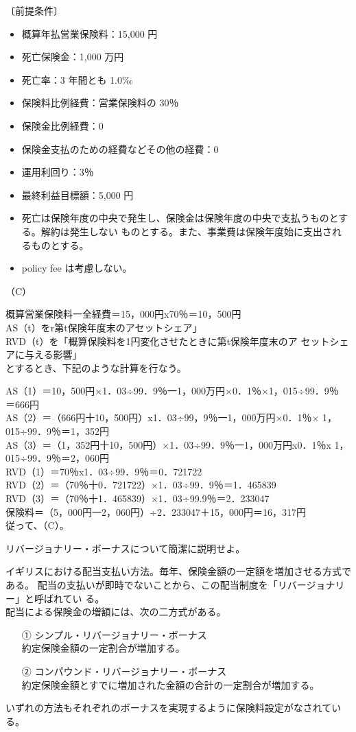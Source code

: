 \documentclass[report,gutter=10mm,fore-edge=10mm,uplatex,dvipdfmx]{jlreq}
\begin{document}
〔前提条件〕
\begin{itemize}
 \item  概算年払営業保険料：15,000 円
 \item 死亡保険金：1,000 万円
 \item  死亡率：3 年間とも 1.0‰
 \item  保険料比例経費：営業保険料の 30％
 \item  保険金比例経費：0
 \item  保険金支払のための経費などその他の経費：0
 \item  運用利回り：3％
 \item  最終利益目標額：5,000 円
 \item  死亡は保険年度の中央で発生し、保険金は保険年度の中央で支払うものとする。解約は発生しない
 ものとする。また、事業費は保険年度始に支出されるものとする。
 \item  policy fee は考慮しない。
\end{itemize}

（C）

概算営業保険料一全経費＝15，000円x70％＝10，500円\\
AS（t）をr第t保険年度末のアセットシェア」\\
RVD（t）を「概算保険料を1円変化させたときに第t保険年度末のア
セットシェアに与える影響」\\
とするとき、下記のような計算を行なう。

AS（1）＝10，500円×1．03÷99．9％一1，000万円×0．1％×1，015÷99．9％
＝666円\\
AS（2）＝（666円十10，500円）x1．03÷99，9％一1，000万円×0．1％×
1，015÷99．9％＝1，352円\\
AS（3）＝（1，352円十10，500円）×1．03÷99．9％一1，000万円x0．1％x
1，015÷99．9％＝2，060円\\
RVD（1）＝70％x1．03÷99．9％＝0．721722\\
RVD（2）＝（70％十0．721722）×1．03÷99．9％＝1．465839\\
RVD（3）＝（70％十1．465839）×1．03÷99.9％＝2．233047\\
保険料＝（5，000円一2，060円）÷2．233047＋15，000円＝16，317円\\
従って、（C）。

リバージョナリー・ボーナスについて簡潔に説明せよ。

イギリスにおける配当支払い方法。毎年、保険金額の一定額を増加させる方式である。
配当の支払いが即時でないことから、この配当制度を「リバージョナリー」と呼ばれてい
る。\\
配当による保険金の増額には、次の二方式がある。
\begin{itemize}
 \item [①]シンプル・リバージョナリー・ボーナス\\
約定保険金額の一定割合が増加する。
 \item [②]コンパウンド・リバージョナリー・ボーナス\\
約定保険金額とすでに増加された金額の合計の一定割合が増加する。
\end{itemize}
いずれの方法もそれぞれのボーナスを実現するように保険料設定がなされている。
\end{document}
